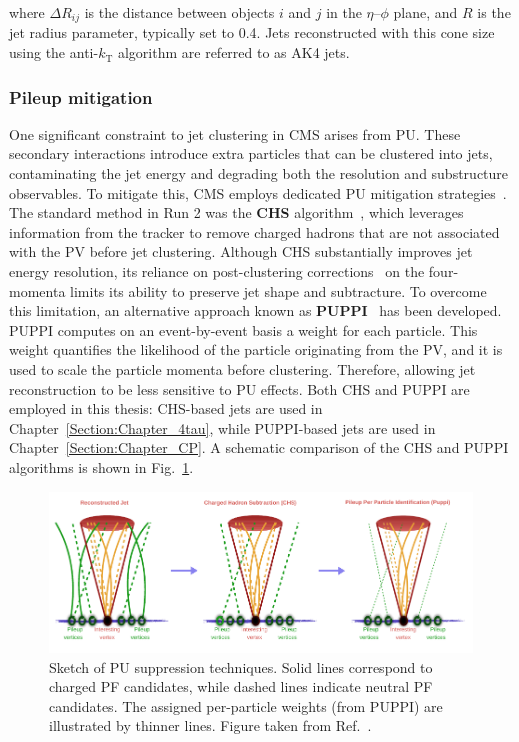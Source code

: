 where $\Delta R_{ij}$ is the distance between objects $i$ and $j$ in the $\eta$–$\phi$ plane, and $R$ is the jet radius parameter, typically set to 0.4. Jets reconstructed with this cone size using the anti-$k_\mathrm{T}$ algorithm are referred to as AK4 jets.

\subsubsection{Pileup mitigation}

One significant constraint to jet clustering in \ac{CMS} arises from \ac{PU}. These secondary interactions introduce extra particles that can be clustered into jets, contaminating the jet energy and degrading both the resolution and substructure observables. To mitigate this, \ac{CMS} employs dedicated \ac{PU} mitigation strategies~\cite{PU_Mitigation}. The standard method in Run 2 was the \textbf{\ac{CHS}} algorithm~\cite{ParticleFlow}, which leverages information from the tracker to remove charged hadrons that are not associated with the PV before jet clustering. Although CHS substantially improves jet energy resolution, its reliance on post-clustering corrections~\cite{JetEnergyCalibration} on the four-momenta limits its ability to preserve jet shape and subtracture. To overcome this limitation, an alternative approach known as \textbf{\ac{PUPPI}}~\cite{PUPPI} has been developed. PUPPI computes on an event-by-event basis a weight for each particle. This weight quantifies the likelihood of the particle originating from the PV, and it is used to scale the particle momenta before clustering. Therefore, allowing jet reconstruction to be less sensitive to \ac{PU} effects. Both CHS and PUPPI are employed in this thesis: CHS-based jets are used in Chapter~\ref{Section:Chapter_4tau}, while PUPPI-based jets are used in Chapter~\ref{Section:Chapter_CP}. A schematic comparison of the CHS and PUPPI algorithms is shown in Fig.~\ref{Figure:Chapter4_Pileup_Schematic}.

\begin{figure}[h]
\centering
\includegraphics[width=\textwidth]{Figures/Chapter4/PU_Shematic.pdf}
\caption[Sketch of pileup suppression techniques]{
Sketch of \ac{PU} suppression techniques. Solid lines correspond to charged PF candidates, while dashed lines indicate neutral PF candidates. The assigned per-particle weights (from PUPPI) are illustrated by thinner lines. Figure taken from Ref.~\cite{Jet_Reconstruction_Run2_Run3}.}
\label{Figure:Chapter4_Pileup_Schematic}
\end{figure}

